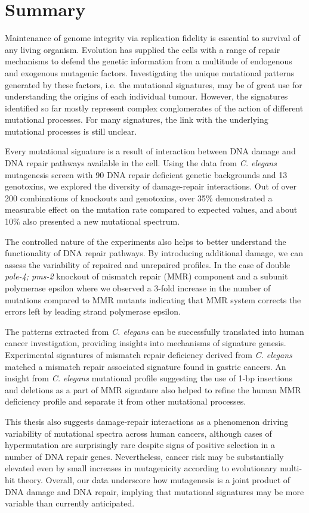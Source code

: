 


\pagestyle{empty}

\chapter*{Summary}

Maintenance of genome integrity via replication fidelity is essential to survival of any living organism. 
Evolution has supplied the cells with a range of repair mechanisms to defend the genetic information from 
a multitude of endogenous and exogenous mutagenic factors. Investigating the unique mutational patterns 
generated by these factors, i.e. the mutational signatures, may be of great use for understanding the 
origins of each individual tumour. However, the signatures identified so far mostly represent complex 
conglomerates of the action of different mutational processes. For many signatures, the link with the 
underlying mutational processes is still unclear.

Every mutational signature is a result of interaction between DNA damage and DNA repair pathways available 
in the cell. Using the data from \textit{C. elegans} mutagenesis screen with 90 DNA repair deficient genetic 
backgrounds and 13 genotoxins, we explored the diversity of damage-repair interactions. Out of over 200 
combinations of knockouts and genotoxins, over 35\% demonstrated a measurable effect on the mutation 
rate compared to expected values, and about 10\% also presented a new mutational spectrum. 

The controlled nature of the experiments also helps to better understand the functionality of DNA repair 
pathways. By introducing additional damage, we can assess the variability of repaired and unrepaired 
profiles. In the case of double \textit{pole-4; pms-2} knockout of mismatch repair (MMR) component and 
a subunit polymerase epsilon where we observed a 3-fold increase in the number of mutations compared to 
MMR mutants indicating that MMR system corrects the errors left by leading strand polymerase epsilon.

The patterns extracted from \textit{C. elegans} can be successfully translated into human cancer investigation, 
providing insights into mechanisms of signature genesis. Experimental signatures of mismatch repair 
deficiency derived from \textit{C. elegans} matched a mismatch repair associated signature found in 
gastric cancers. An insight from \textit{C. elegans} mutational profile suggesting the use of 1-bp 
insertions and deletions as a part of MMR signature also helped to refine the human MMR deficiency 
profile and separate it from other mutational processes.

This thesis also suggests damage-repair interactions as a phenomenon driving variability of mutational 
spectra across human cancers, although cases of hypermutation are surprisingly rare despite signs of 
positive selection in a number of DNA repair genes. Nevertheless, cancer risk may be substantially 
elevated even by small increases in mutagenicity according to evolutionary multi-hit theory. Overall, 
our data underscore how mutagenesis is a joint product of DNA damage and DNA repair, implying that 
mutational signatures may be more variable than currently anticipated.


